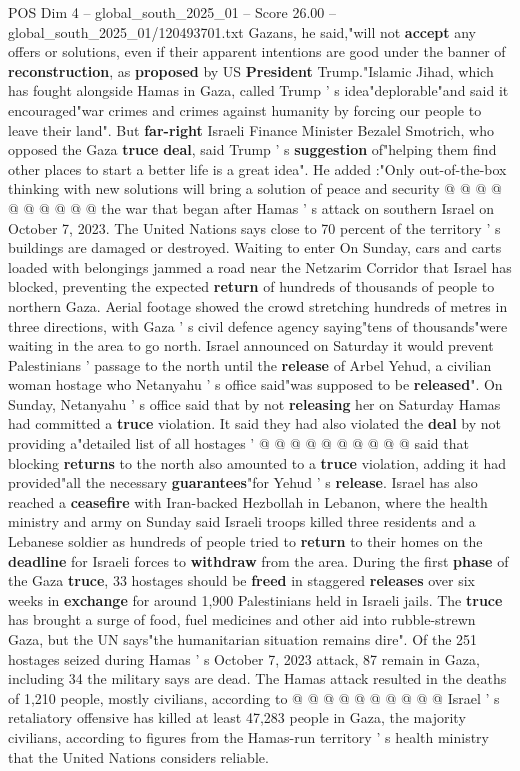\begin{textsample}{POS Dim 4 – global\_south\_2025\_01 – Score 26.00 – global\_south\_2025\_01/120493701.txt}
Gazans, he said,"will not \textbf{accept} any offers or solutions, even if their apparent intentions are good under the banner of \textbf{reconstruction}, as \textbf{proposed} by US \textbf{President} Trump."Islamic Jihad, which has fought alongside Hamas in Gaza, called Trump ' s idea"deplorable"and said it encouraged"war crimes and crimes against humanity by forcing our people to leave their land".
But \textbf{far-right} Israeli Finance Minister Bezalel Smotrich, who opposed the Gaza \textbf{truce} \textbf{deal}, said Trump ' s \textbf{suggestion} of"helping them find other places to start a better life is a great idea".
He added :"Only out-of-the-box thinking with new solutions will bring a solution of peace and security @ @ @ @ @ @ @ @ @ @ the war that began after Hamas ' s attack on southern Israel on October 7, 2023.
The United Nations says close to 70 percent of the territory ' s buildings are damaged or destroyed.
Waiting to enter On Sunday, cars and carts loaded with belongings jammed a road near the Netzarim Corridor that Israel has blocked, preventing the expected \textbf{return} of hundreds of thousands of people to northern Gaza.
Aerial footage showed the crowd stretching hundreds of metres in three directions, with Gaza ' s civil defence agency saying"tens of thousands"were waiting in the area to go north.
Israel announced on Saturday it would prevent Palestinians ' passage to the north until the \textbf{release} of Arbel Yehud, a civilian woman hostage who Netanyahu ' s office said"was supposed to be \textbf{released}".
On Sunday, Netanyahu ' s office said that by not \textbf{releasing} her on Saturday Hamas had committed a \textbf{truce} violation.
It said they had also violated the \textbf{deal} by not providing a"detailed list of all hostages ' @ @ @ @ @ @ @ @ @ @ said that blocking \textbf{returns} to the north also amounted to a \textbf{truce} violation, adding it had provided"all the necessary \textbf{guarantees}"for Yehud ' s \textbf{release}.
Israel has also reached a \textbf{ceasefire} with Iran-backed Hezbollah in Lebanon, where the health ministry and army on Sunday said Israeli troops killed three residents and a Lebanese soldier as hundreds of people tried to \textbf{return} to their homes on the \textbf{deadline} for Israeli forces to \textbf{withdraw} from the area.
During the first \textbf{phase} of the Gaza \textbf{truce}, 33 hostages should be \textbf{freed} in staggered \textbf{releases} over six weeks in \textbf{exchange} for around 1,900 Palestinians held in Israeli jails.
The \textbf{truce} has brought a surge of food, fuel medicines and other aid into rubble-strewn Gaza, but the UN says"the humanitarian situation remains dire".
Of the 251 hostages seized during Hamas ' s October 7, 2023 attack, 87 remain in Gaza, including 34 the military says are dead.
The Hamas attack resulted in the deaths of 1,210 people, mostly civilians, according to @ @ @ @ @ @ @ @ @ @ Israel ' s retaliatory offensive has killed at least 47,283 people in Gaza, the majority civilians, according to figures from the Hamas-run territory ' s health ministry that the United Nations considers reliable.


\end{textsample}
